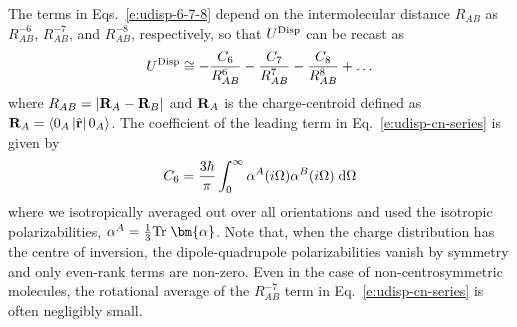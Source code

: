 \documentclass[b5paper,oneside,fleqn,11pt]{book}
\newcommand{\BM}[1]{\bm{#1}}
\begin{document}
\begin{refsection}
%
The terms in Eqs.~\eqref{e:udisp-6-7-8} depend on the intermolecular distance 
$R_{AB}$ as $R^{-6}_{AB}$, $R^{-7}_{AB}$, and $R^{-8}_{AB}$, 
respectively, so that $U^{\rm Disp}$ can be recast as
%
\begin{equation} \label{e:udisp-cn-series}
 U^{\rm Disp} \cong -\frac{C_6}{R^{6}_{AB}} -\frac{C_7}{R^{7}_{AB}} -\frac{C_8}{R^{8}_{AB}} + \ldots
\end{equation}
%
where $R_{AB}=\left|{\bf R}_A-{\bf R}_B\right|$ 
and ${\bf R}_A$ is the charge\hyp{}centroid 
defined as ${\bf R}_A=\langle 0_A\left|\hat{\bf r}\right|0_A\rangle$. 
The coefficient of the leading term in Eq.~\eqref{e:udisp-cn-series} is given by
%
\begin{equation} \label{e:c6}
 C_6 = \frac{3\hbar}{\pi} \int_0^\infty \alpha^A(i\Omega) \alpha^B(i\Omega) \;{\rm d}\Omega
\end{equation}
%
where we isotropically averaged out over all orientations and used the 
isotropic polarizabilities, $\alpha^A=\frac{1}{3}{\rm Tr}\;{\BM \alpha}$.
Note that, when the charge distribution has the centre of inversion, 
the dipole\hyp{}quadrupole polarizabilities vanish by symmetry 
and only even\hyp{}rank terms are non\hyp{}zero. Even in the case 
of non\hyp{}centrosymmetric molecules, the rotational average 
of the $R^{-7}_{AB}$ term in Eq.~\eqref{e:udisp-cn-series} 
is often negligibly small. \citep{Stone.TheTheoryOfIntermolecularForces.1996}


\end{refsection}
\end{document}
